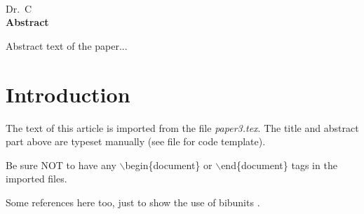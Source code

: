 \begin{bibunit}
\thispagestyle{plain}
\begin{center}
\Large\textbf{\papertitle}\\
\vspace{10mm}
\normalsize Dr.~C\\
\vspace{15mm}
\textbf{Abstract}\\
\end{center}
Abstract text of the paper...

\section{Introduction}
The text of this article is imported from the file
\textit{paper3.tex}. The title and abstract part above are typeset
manually (see file for code template).

Be sure NOT to have any $\backslash$begin\{document\} or
$\backslash$end\{document\} tags in the imported files.

Some references here too, just to show the use of bibunits
\nocite{*}.


\putbib
\end{bibunit}
